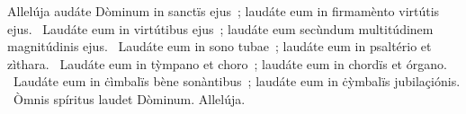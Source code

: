 { Allelúja}
{%
audáte Dòminum in sanctïs ejus~; laudáte eum in firmamènto virtútis ejus. 
~Laudáte eum in virtútibus ejus~; laudáte eum secùndum multitúdinem magnitúdinis ejus. 
~Laudáte eum in sono tubae~; laudáte eum in psaltério et zìthara. 
~Laudáte eum in tỳmpano et choro~; laudáte eum in chordïs et órgano. 
~Laudáte eum in ċìmbalïs bène sonàntibus~; laudáte eum in ċỳmbalïs jubilaçiónis. 
~Òmnis spíritus laudet Dòminum. Allelúja. 
}
